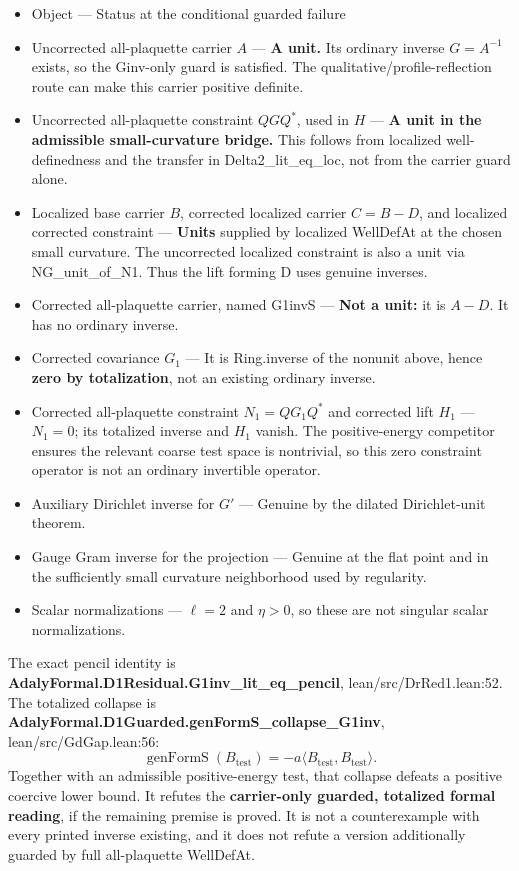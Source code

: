 \begin{itemize}
\item  Object  ---  Status at the conditional guarded failure 
\item  Uncorrected all-plaquette carrier \(A\)  ---  \textbf{A unit.} Its ordinary inverse \(G=A^{-1}\) exists, so the Ginv-only guard is satisfied. The qualitative/profile-reflection route can make this carrier positive definite. 
\item  Uncorrected all-plaquette constraint \(QGQ^*\), used in \(H\)  ---  \textbf{A unit in the admissible small-curvature bridge.} This follows from localized well-definedness and the transfer in Delta2\_lit\_eq\_loc, not from the carrier guard alone. 
\item  Localized base carrier \(B\), corrected localized carrier \(C=B-D\), and localized corrected constraint  ---  \textbf{Units} supplied by localized WellDefAt at the chosen small curvature. The uncorrected localized constraint is also a unit via NG\_unit\_of\_N1. Thus the lift forming D uses genuine inverses. 
\item  Corrected all-plaquette carrier, named G1invS  ---  \textbf{Not a unit:} it is \(A-D\). It has no ordinary inverse. 
\item  Corrected covariance \(G_1\)  ---  It is Ring.inverse of the nonunit above, hence \textbf{zero by totalization}, not an existing ordinary inverse. 
\item  Corrected all-plaquette constraint \(N_1=QG_1Q^*\) and corrected lift \(H_1\)  ---  \(N_1=0\); its totalized inverse and \(H_1\) vanish. The positive-energy competitor ensures the relevant coarse test space is nontrivial, so this zero constraint operator is not an ordinary invertible operator. 
\item  Auxiliary Dirichlet inverse for \(G'\)  ---  Genuine by the dilated Dirichlet-unit theorem. 
\item  Gauge Gram inverse for the projection  ---  Genuine at the flat point and in the sufficiently small curvature neighborhood used by regularity. 
\item  Scalar normalizations  ---  \(\ell=2\) and \(\eta>0\), so these are not singular scalar normalizations. 
\end{itemize}

The exact pencil identity is \textbf{AdalyFormal.D1Residual.G1inv\_lit\_eq\_pencil}, lean/src/DrRed1.lean:52. The totalized collapse is \textbf{AdalyFormal.D1Guarded.genFormS\_collapse\_G1inv}, lean/src/GdGap.lean:56:
\[
\operatorname{genFormS}(B_{\mathrm{test}})=-a\langle B_{\mathrm{test}},B_{\mathrm{test}}\rangle.
\]
Together with an admissible positive-energy test, that collapse defeats a positive coercive lower bound. It refutes the \textbf{carrier-only guarded, totalized formal reading}, if the remaining premise is proved. It is not a counterexample with every printed inverse existing, and it does not refute a version additionally guarded by full all-plaquette WellDefAt.

